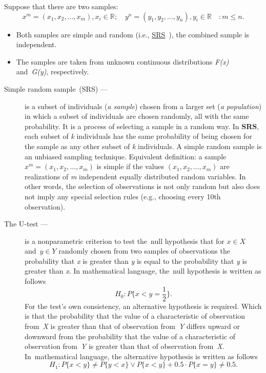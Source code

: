 \documentclass[]{scrreprt}
\begin{document}
Suppose that there are two samples:
\begin{equation*}
x^{m} = (x_{1},x_{2},\ldots,x_{m}), x_{i} \in \mathbb{R};\quad y^{n} = (y_{1},y_{2},\ldots,y_{n}), y_{i} \in \mathbb{R} \quad: m \leq n.
\end{equation*}
%
\begin{itemize}
	\item Both samples are simple and random (i.e., \href{https://en.wikipedia.org/wiki/Simple_random_sample}{SRS}~\cite{Wiki:SRS}), the combined sample is independent.
	\item The samples are taken from unknown continuous distributions \textit{F(x)} and~\textit{G(y)}, respectively.
\end{itemize}
%
\begin{description}
	\item[Simple random sample~(SRS) ---] is a subset of individuals (\emph{a sample}) chosen from a larger set (\emph{a population}) in which a subset of individuals are chosen randomly, all with the same probability. It is a process of selecting a sample in a random way. In \textbf{SRS}, each subset of \textit{k} individuals has the same probability of being chosen for the sample as any other subset of \textit{k} individuals. A simple random sample is an unbiased sampling technique. Equivalent definition: a sample ${\textstyle x^{m} = (x_{1},x_{2},\ldots,x_{m})}$ is simple if the values ${\textstyle (x_{1},x_{2},\ldots,x_{m})}$ are realizations of \textit{m} independent equally distributed random variables. In other words, the selection of observations is not only random but also does not imply any special selection rules (e.g., choosing every 10th observation).
\end{description}
%
\begin{description}
	\item[The U-test ---] is a nonparametric criterion to test the~null hypothesis that for $x \in X$ and~$y \in Y$ randomly chosen from two samples of observations the probability that \textit{x} is greater than \textit{y} is equal to the probability that \textit{y} is greater than \textit{x}. In mathematical language, the~null hypothesis is written as follows
	\begin{equation}\label{eq:U-test-null-hypothesis}
	H_{0}:P\{x<y=\frac{1}{2}\}.
	\end{equation}
	For the test's own consistency, an alternative hypothesis is required. Which is that the probability that the value of a characteristic of observation from~\textit{X} is greater than that of observation from~\textit{Y} differs upward or downward from the probability that the value of a characteristic of observation from~\textit{Y} is greater than that of observation from~\textit{X}. In~mathematical language, the alternative hypothesis is written as follows
	\begin{equation}\label{eq:U-test-alt-hypothesis}
	H_{1}:P\{x<y\} \neq P\{y<x\} \vee P\{x<y\} + 0.5 \cdot P\{x=y\} \neq 0.5.
	\end{equation}
\end{description}
\end{document}

